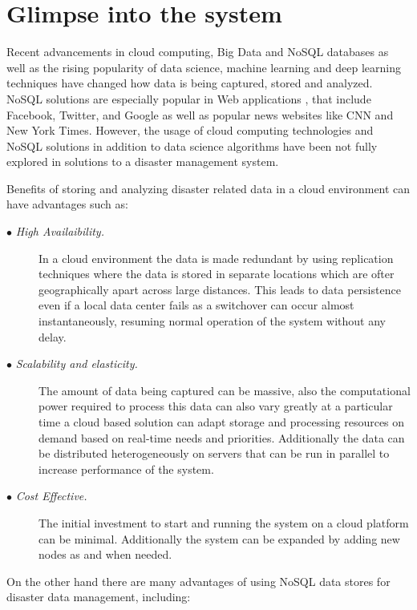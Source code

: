 \section{Glimpse into the system}

Recent advancements in cloud computing, Big Data and NoSQL databases as well as the rising popularity of data science, machine learning and deep learning techniques have changed how data is being captured, stored and analyzed. NoSQL solutions are especially popular in Web applications \cite{sakr2011survey}, that include Facebook, Twitter, and Google as well as popular news websites like CNN and New York Times. However, the usage of cloud computing technologies and NoSQL solutions in addition to data science algorithms have been not fully explored in solutions to a disaster management system.

Benefits of storing and analyzing disaster related data in a cloud environment can have advantages \cite{kossmann2010data} such as:

\begin{description}
	
	\item[$\bullet$ \it High Availaibility.]
	\hfill\break
	In a cloud environment the data is made redundant by using replication techniques where the data is stored in separate locations which are ofter geographically apart across large distances. This leads to data persistence even if a local data center fails as a switchover can occur almost instantaneously, resuming normal operation of the system without any delay.
	
	\item[$\bullet$ \it Scalability and elasticity.]
	\hfill\break
	The amount of data being captured can be massive, also the computational power required to process this data can also vary greatly at a particular time a cloud based solution can adapt storage and processing resources on demand based on real-time needs and priorities. Additionally the data can be distributed heterogeneously on servers that can be run in parallel to increase performance of the system.  
	
	\item[$\bullet$ \it Cost Effective.]
	\hfill\break
	The initial investment to start and running the system on a cloud platform can be minimal. Additionally the system can be expanded by adding new nodes as and when needed.
\end{description}

On the other hand there are many advantages of using NoSQL data stores for disaster data management, including:

